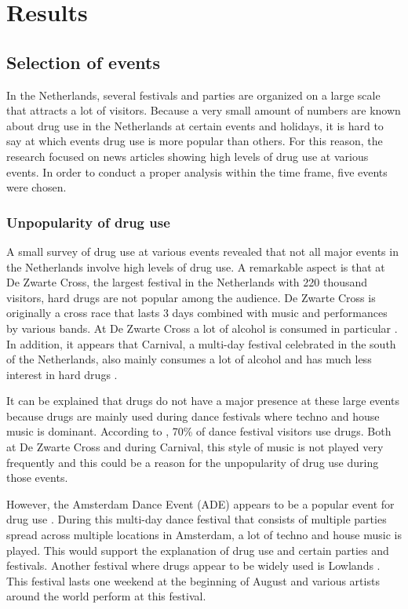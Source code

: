 \section{Results}

\subsection{Selection of events}

In the Netherlands, several festivals and parties are organized on a large scale that attracts a lot of visitors. Because a very small amount of numbers are known about drug use in the Netherlands at certain events and holidays, it is hard to say at which events drug use is more popular than others. For this reason, the research focused on news articles showing high levels of drug use at various events. In order to conduct a proper analysis within the time frame, five events were chosen.  

\subsubsection{Unpopularity of drug use}

A small survey of drug use at various events revealed that not all major events in the Netherlands involve high levels of drug use. A remarkable aspect is that at De Zwarte Cross, the largest festival in the Netherlands with 220 thousand visitors, hard drugs are not popular among the audience. De Zwarte Cross is originally a cross race that lasts 3 days combined with music and performances by various bands. At De Zwarte Cross a lot of alcohol is consumed in particular \cite{Sprikkelman}. In addition, it appears that Carnival, a multi-day festival celebrated in the south of the Netherlands, also mainly consumes a lot of alcohol and has much less interest in hard drugs \cite{Kerstens}. 

It can be explained that drugs do not have a major presence at these large events because drugs are mainly used during dance festivals where techno and house music is dominant. According to \cite{Coppens}, 70\% of dance festival visitors use drugs. Both at De Zwarte Cross and during Carnival, this style of music is not played very frequently and this could be a reason for the unpopularity of drug use during those events.

However, the Amsterdam Dance Event (ADE) appears to be a popular event for drug use \cite{RTL}. During this multi-day dance festival that consists of multiple parties spread across multiple locations in Amsterdam, a lot of techno and house music is played. This would support the explanation of drug use and certain parties and festivals. 
Another festival where drugs appear to be widely used is Lowlands \cite{NOS}. This festival lasts one weekend at the beginning of August and various artists around the world perform at this festival. 


